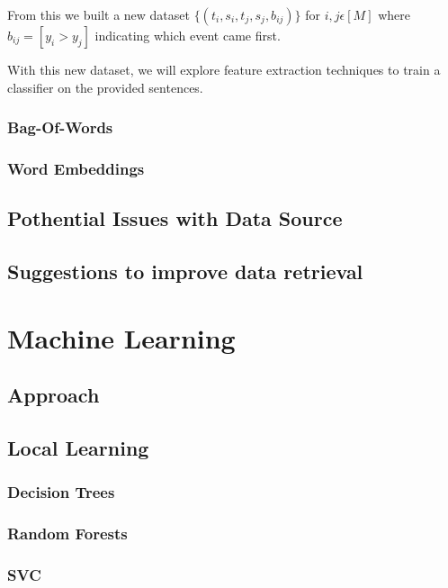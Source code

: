 \documentclass[12pt]{report}
\begin{document}
                From this we built a new dataset $\{(t_{i},s_{i},t_{j},s_{j},b_{ij})\}$ for $i,j \epsilon [M]$
                where $b_{ij} = [y_{i} > y_{j}]$ indicating which event came first.

                With this new dataset, we will explore feature extraction techniques to train a classifier
                on the provided sentences.
                
                \subsection{Bag-Of-Words}
                \subsection{Word Embeddings}
        \section{Pothential Issues with Data Source}
        \section{Suggestions to improve data retrieval}

\chapter{Machine Learning}

\section{Approach}

\section{Local Learning}
\subsection{Decision Trees}
\subsection{Random Forests}
\subsection{SVC}
\end{document}
